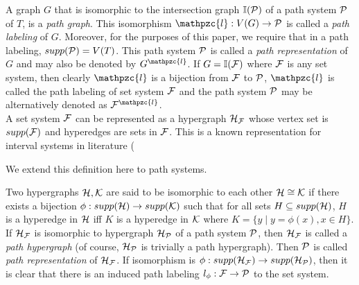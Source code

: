 \documentclass{llncs}
\def\cF{{\cal F}}
\def\cH{{\cal H}}
\def\cK{{\cal K}}
\def\cP{{\cal P}}
\def\H{{\mathcal H}}
\def\bI{\mathbb I}
\def\cl{\mathpzc{l}}
\newcommand{\rcomment}[1]{}
\begin{document}
\noindent
A graph $G$ that is isomorphic to the intersection graph $\bI(\cP)$ of a
path system $\cP$ of $T$, is a {\em path graph}. This
isomorphism $\cl: V(G) \rightarrow \cP$ is called a {\em path
  labeling} of $G$. Moreover, for the purposes of this paper, we
require that in a path labeling, $supp(\cP) = V(T)$. This path system $\cP$ is called a {\em path
representation} of $G$ and may also be denoted by $G^\cl$. If $G =
\bI(\cF)$ where $\cF$ is any set system, then clearly $\cl$ is a
bijection from $\cF$ to $\cP$, $\cl$ is called the
path labeling of set system $\cF$ and the path system $\cP$ may be alternatively
denoted as $\cF^\cl$. \\


\rcomment
{ define hypergraph}

\noindent
A set system $\cF$ can be represented as a hypergraph $\H_\cF$ whose
vertex set is $supp(\cF)$ and hyperedges are sets in $\cF$. This is a
known representation for interval systems in literature (
\rcomment
{*** CITATION ****
BLS99, Section 8.7 from KKLV10).} 
We extend this definition here to path systems.

\noindent
Two hypergraphs $\cH, \cK$ are said to be isomorphic to each other
$\cH \cong \cK$ if there exists a bijection $\phi: supp(\cH)
\rightarrow supp(\cK)$ such that 
for all sets $H \subseteq supp(\cH)$, $H$ is a hyperedge in $\cH$ iff
$K$ is a hyperedge in $\cK$ where $K = \{y \mid y = \phi(x), x \in H\}$.\\


\noindent
If $\H_\cF$ is isomorphic to hypergraph $\H_\cP$ of a path system
$\cP$, then $\H_\cF$ is called a {\em path hypergraph} (of course, 
$\H_\cP$ is trivially a path hypergraph). Then $\cP$
is called {\em path representation} of $\H_\cF$. If isomorphism is
$\phi: supp(\H_\cF) \rightarrow supp(\H_\cP)$, then it is clear that
there is an induced path labeling $l_\phi: \cF \rightarrow \cP$ to the
set system.\\


\rcomment
{Several path labelings could result in the same path representation. EXPAND?}
\end{document}
